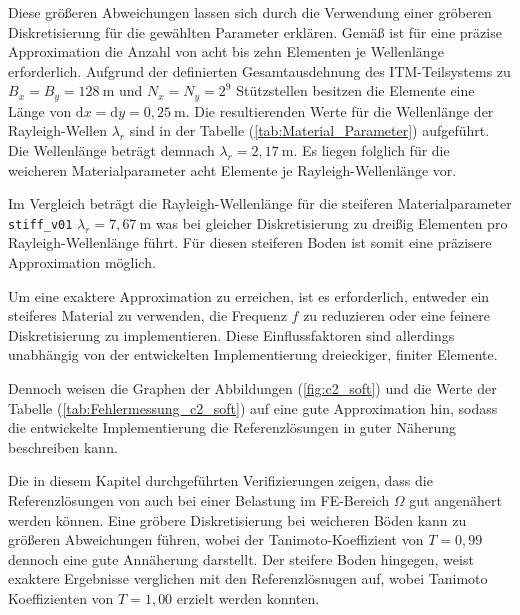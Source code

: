 Diese größeren Abweichungen lassen sich durch die Verwendung einer gröberen Diskretisierung für die gewählten Parameter erklären. Gemäß \cite{Freisinger_Hackenberg2020} ist für eine präzise Approximation die Anzahl von acht bis zehn Elementen je Wellenlänge erforderlich. Aufgrund der definierten Gesamtausdehnung des ITM-Teilsystems zu $B_x = B_y = 128\ \mathrm{m}$ und $N_x = N_y = 2^{9}$ Stützstellen besitzen die Elemente eine Länge von $\mathrm{d}x = \mathrm{d}y = 0,25\ \mathrm{m}$. Die resultierenden Werte für die Wellenlänge der Rayleigh-Wellen $\lambda_r$ sind in der Tabelle (\ref{tab:Material_Parameter}) aufgeführt. Die Wellenlänge beträgt demnach $\lambda_r = 2,17\ \mathrm{m}$. Es liegen folglich für die weicheren Materialparameter acht Elemente je Rayleigh-Wellenlänge vor. 

Im Vergleich beträgt die Rayleigh-Wellenlänge für die steiferen Materialparameter \texttt{stiff\_v01} $\lambda_r = 7,67\ \mathrm{m}$ was bei gleicher Diskretisierung zu dreißig Elementen pro Rayleigh-Wellenlänge führt. Für diesen steiferen Boden ist somit eine präzisere Approximation möglich.

Um eine exaktere Approximation zu erreichen, ist es erforderlich, entweder ein steiferes Material zu verwenden, die Frequenz $f$ zu reduzieren oder eine feinere Diskretisierung zu implementieren. Diese Einflussfaktoren sind allerdings unabhängig von der entwickelten Implementierung dreieckiger, finiter Elemente.





Dennoch weisen die Graphen der Abbildungen (\ref{fig:c2_soft}) und die Werte der Tabelle (\ref{tab:Fehlermessung_c2_soft}) auf eine gute Approximation hin, sodass die entwickelte Implementierung die Referenzlösungen in guter Näherung beschreiben kann.

Die in diesem Kapitel durchgeführten Verifizierungen zeigen, dass die Referenzlösungen von \cite{Freisinger2022} auch bei einer Belastung im FE-Bereich $\Omega$ gut angenähert werden können. 
Eine gröbere Diskretisierung bei weicheren Böden kann zu größeren Abweichungen führen, wobei der Tanimoto-Koeffizient von $T = 0,99$ dennoch eine gute Annäherung darstellt.
Der steifere Boden hingegen, weist exaktere Ergebnisse verglichen mit den Referenzlösnugen auf, wobei Tanimoto Koeffizienten von $T = 1,00$ erzielt werden konnten.






